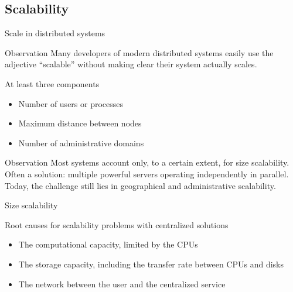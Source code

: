 \subsection{Scalability}
\begin{slide}{Scale in distributed systems}
  \begin{block}{Observation}
    Many developers  of modern distributed systems easily  use the adjective ``scalable''  without making clear
     their system actually scales.
  \end{block}
  \begin{block}{At least three components}
    \begin{itemize}
    \item Number of users or processes 
    \item Maximum distance between nodes 
    \item Number of administrative domains 
    \end{itemize}
  \end{block}
  \begin{alertblock}{Observation}
    Most systems account only, to a certain extent, for size scalability. Often a solution: multiple powerful
    servers operating independently in parallel. Today, the challenge still lies in geographical and
    administrative scalability.
  \end{alertblock}
\end{slide}
\begin{slide}{Size scalability}
  \begin{block}{Root causes for scalability problems with centralized solutions}
    \begin{itemize}
    \item The computational capacity, limited by the CPUs
    \item The storage capacity, including the transfer rate between CPUs and disks
    \item The network between the user and the centralized service
    \end{itemize}
  \end{block}
\end{slide}
